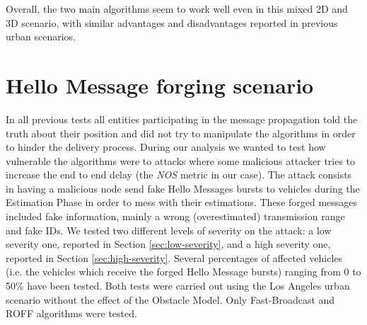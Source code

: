 	
	Overall, the two main algorithms seem to work well even in this mixed 2D and 3D scenario, with similar advantages and disadvantages reported in previous urban scenarios.
	

	\section{Hello Message forging scenario}
		In all previous tests all entities participating in the message propagation told the truth about their position and did not try to manipulate the algorithms in order to hinder the delivery process. During our analysis we wanted to test how vulnerable the algorithms were to attacks where some malicious attacker tries to increase the end to end delay (the \textit{NOS} metric in our case). The attack consists in having a malicious node send fake Hello Messages bursts to vehicles during the Estimation Phase in order to mess with their estimations. These forged messages included fake information, mainly a wrong (overestimated) transmission range and fake IDs. We tested two different levels of severity on the attack: a low severity one, reported in Section \ref{sec:low-severity}, and a high severity one, reported in Section \ref{sec:high-severity}. Several percentages of affected vehicles (i.e. the vehicles which receive the forged Hello Message bursts) ranging from 0 to 50\% have been tested. Both tests were carried out using the Los Angeles urban scenario without the effect of the Obstacle Model. Only Fast-Broadcast and ROFF algorithms were tested.
		
